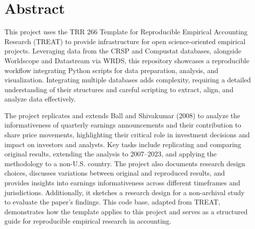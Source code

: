 \clearpage
{}
\setcounter{page}{3}  %
\section*{Abstract}

This project uses the TRR 266 Template for Reproducible Empirical Accounting Research (TREAT) to provide infrastructure for open science-oriented empirical projects. Leveraging data from the CRSP and Compustat databases, alongside Worldscope and Datastream via WRDS, this repository showcases a reproducible workflow integrating Python scripts for data preparation, analysis, and visualization. Integrating multiple databases adds complexity, requiring a detailed understanding of their structures and careful scripting to extract, align, and analyze data effectively.

The project replicates and extends Ball and Shivakumar (2008) to analyze the informativeness of quarterly earnings announcements and their contribution to share price movements, highlighting their critical role in investment decisions and impact on investors and analysts. Key tasks include replicating and comparing original results, extending the analysis to 2007–2023, and applying the methodology to a non-U.S. country. The project also documents research design choices, discusses variations between original and reproduced results, and provides insights into earnings informativeness across different timeframes and jurisdictions. Additionally, it sketches a research design for a non-archival study to evaluate the paper’s findings. This code base, adapted from TREAT, demonstrates how the template applies to this project and serves as a structured guide for reproducible empirical research in accounting.

\clearpage